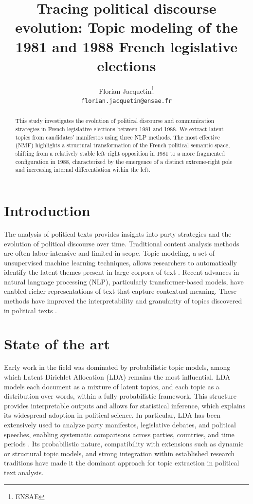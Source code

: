 \documentclass{article}
\title{Tracing political discourse evolution: Topic modeling of the 1981 and 1988 French legislative elections}
\author{%
  Florian Jacquetin\thanks{ENSAE}  \\
  \texttt{florian.jacquetin@ensae.fr}
}
\begin{document}
\maketitle


\begin{abstract}
This study investigates the evolution of political discourse and communication strategies in French legislative elections between 1981 and 1988. We extract latent topics from candidates' manifestos using three NLP methods. The most effective (NMF) highlights a structural transformation of the French political semantic space, shifting from a relatively stable left–right opposition in 1981 to a more fragmented configuration in 1988, characterized by the emergence of a distinct extreme-right pole and increasing internal differentiation within the left.
\end{abstract}


\section{Introduction}
The analysis of political texts provides insights into party strategies and the evolution of political discourse over time. Traditional content analysis methods are often labor-intensive and limited in scope. Topic modeling, a set of unsupervised machine learning techniques, allows researchers to automatically identify the latent themes present in large corpora of text \citep{blei2003latent}. Recent advances in natural language processing (NLP), particularly transformer-based models, have enabled richer representations of text that capture contextual meaning. These methods have improved the interpretability and granularity of topics discovered in political texts \citep{grootendorst2022bertopic}.

\section{State of the art}

Early work in the field was dominated by probabilistic topic models, among which Latent Dirichlet Allocation (LDA) \citep{blei2003latent} remains the most influential. LDA models each document as a mixture of latent topics, and each topic as a distribution over words, within a fully probabilistic framework. This structure provides interpretable outputs and allows for statistical inference, which explains its widespread adoption in political science. In particular, LDA has been extensively used to analyze party manifestos, legislative debates, and political speeches, enabling systematic comparisons across parties, countries, and time periods \citep{greene2016topic}. Its probabilistic nature, compatibility with extensions such as dynamic or structural topic models, and strong integration within established research traditions have made it the dominant approach for topic extraction in political text analysis.
\end{document}
